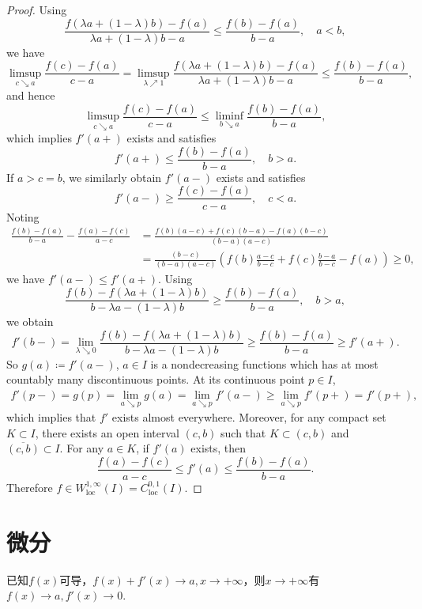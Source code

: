 \begin{proof}
	Using 
	\[
	\frac{f(\lambda a + (1-\lambda)b) - f(a)}{\lambda a + (1-\lambda)b - a} \leq \frac{f(b) - f(a)}{b-a},\quad a < b,
	\]
	we have
	\[
	\limsup_{c\searrow a}\frac{f(c)-f(a)}{c-a} 
	= \limsup_{\lambda\nearrow 1}\frac{f(\lambda a + (1-\lambda)b) - f(a)}{\lambda a + (1-\lambda)b - a} 
	\leq \frac{f(b) - f(a)}{b-a},
	\]
	and hence 
	\[
	\limsup_{c\searrow a}\frac{f(c)-f(a)}{c-a} 
	\leq \liminf_{b\searrow a}\frac{f(b)-f(a)}{b-a},
	\]
	which implies $f'(a+)$ exists and satisfies 
	\[
	f'(a+)\leq \frac{f(b) - f(a)}{b-a},\quad b>a.
	\]
	If $a>c=b$, we similarly obtain $f'(a-)$ exists and satisfies 
	\[
	f'(a-)\geq \frac{f(c) - f(a)}{c-a},\quad c<a.
	\]
	Noting 
	\begin{align*}
	\frac{f(b) - f(a)}{b-a} - \frac{f(a) - f(c)}{a-c}
	&= \frac{f(b)(a-c) + f(c)(b-a) - f(a)(b-c)}{(b-a)(a-c)}\\
	&= \frac{(b-c)}{(b-a)(a-c)}\left(f(b)\frac{a-c}{b-c} + f(c)\frac{b-a}{b-c} - f(a) \right)\geq 0,
	\end{align*}
	we have $f'(a-)\leq f'(a+)$.
	Using 
	\[
	\frac{f(b) - f(\lambda a + (1-\lambda)b)}{b - \lambda a - (1-\lambda)b} \geq \frac{f(b) - f(a)}{b-a},\quad b>a,
	\]
	we obtain
	\[
	f'(b-) = \lim_{\lambda\searrow0}\frac{f(b) - f(\lambda a + (1-\lambda)b)}{b - \lambda a - (1-\lambda)b}\geq \frac{f(b) - f(a)}{b-a}\geq f'(a+).
	\]
	So $g(a) \coloneq f'(a-)$, $a\in I$ is a nondecreasing functions 
	which has at most countably many  discontinuous points.
	At its continuous point $p\in I$,
	\begin{align*}
		f'(p-) = g(p) = \lim_{a\searrow p}g(a) 
		= \lim_{a\searrow p} f'(a-) \geq \lim_{a\searrow p}f'(p+) = f'(p+),
	\end{align*} 
	which implies that $f'$ exists almost everywhere.
	Moreover, for any compact set $K\subset I$, 
	there exists an open interval $(c,b)$ such that $K\subset(c,b)$ and $\overline{(c,b)}\subset I$. 
	For any $a\in K$, if $f'(a)$ exists, 
	then  
	\[
	\frac{f(a) - f(c)}{a - c} 
	\leq f'(a) \leq \frac{f(b) - f(a)}{b - a}.
	\] 
	Therefore $f\in W^{1,\infty}_{\mathrm{loc}}(I) = C^{0,1}_{\mathrm{loc}}(I)$.
\end{proof}



\section{微分}

  \begin{example}
   已知$f(x)$可导，$f(x)+f'(x)\rightarrow a,x\rightarrow+\infty$，则$x\rightarrow+\infty$有$f(x)\rightarrow a,f'(x)\rightarrow0$. %
  \end{example} 

